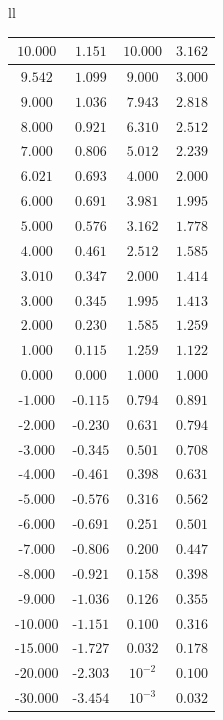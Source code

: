 \begin{tabular}{ll}
{\begin{tabular}{|c|c|c|c|}
    \textbf{$10.000$} & $1.151$ & \textbf{$10.000$} & $3.162$ \\ \hline
    $9.542$ & $1.099$ & $9.000$ & $3.000$ \\ \hline
    $9.000$ & $1.036$ & $7.943$ & $2.818$ \\ \hline
    $8.000$ & $0.921$ & $6.310$ & $2.512$ \\ \hline
    $7.000$ & $0.806$ & $5.012$ & $2.239$ \\ \hline
    \textbf{$6.021$} & \textbf{$0.693$} & \textbf{$4.000$} & \textbf{$2.000$} \\ \hline
    $6.000$ & $0.691$ & $3.981$ & $1.995$ \\ \hline
    $5.000$ & $0.576$ & $3.162$ & $1.778$ \\ \hline
    $4.000$ & $0.461$ & $2.512$ & $1.585$ \\ \hline
    \textbf{$3.010$} & \textbf{$0.347$} & \textbf{$2.000$} & \textbf{$1.414$} \\ \hline
    $3.000$ & $0.345$ & $1.995$ & $1.413$ \\ \hline
    $2.000$ & $0.230$ & $1.585$ & $1.259$ \\ \hline
    $1.000$ & $0.115$ & $1.259$ & $1.122$ \\ \hline
    $0.000$ & $0.000$ & $1.000$ & $1.000$ \\ \hline
    -$1.000$ & -$0.115$ & $0.794$ & $0.891$ \\ \hline
    -$2.000$ & -$0.230$ & $0.631$ & $0.794$ \\ \hline
    -$3.000$ & -$0.345$ & $0.501$ & $0.708$ \\ \hline
    -$4.000$ & -$0.461$ & $0.398$ & $0.631$ \\ \hline
    -$5.000$ & -$0.576$ & $0.316$ & $0.562$ \\ \hline
    -$6.000$ & -$0.691$ & $0.251$ & $0.501$ \\ \hline
    -$7.000$ & -$0.806$ & $0.200$ & $0.447$ \\ \hline
    -$8.000$ & -$0.921$ & $0.158$ & $0.398$ \\ \hline
    -$9.000$ & -$1.036$ & $0.126$ & $0.355$ \\ \hline
    -$10.000$ & -$1.151$ & $0.100$ & $0.316$ \\ \hline
    -$15.000$ & -$1.727$ & $0.032$ & $0.178$ \\ \hline
    -$20.000$ & -$2.303$ & $10^{-2}$ & $0.100$ \\ \hline
    -$30.000$ & -$3.454$ & $10^{-3}$ & $0.032$ \\ \hline

\end{tabular}}
\end{tabular}
